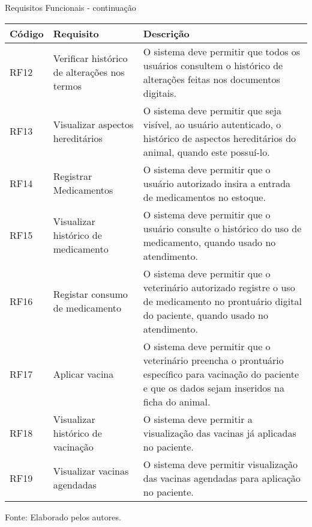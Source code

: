 \documentclass[
    12pt,               %
    openright,          %
    oneside,
    a4paper,            %
    BIBLATEX,           %
    TODO,               %
    english,            %
    brazil              %
    ]{ifsp-spo-inf-ctds}
\begin{document}
            \begin{center}
                \begin{quadro}[H]
                \caption{Requisitos Funcionais - continuação}
                \begin{tabulary}{1.0\textwidth}{|p{5em}|p{8em}|p{18em}|}
                \hline
                Código & Requisito & Descrição\\
                \hline
                RF12 & Verificar histórico de alterações nos termos & O sistema deve permitir que todos os usuários consultem o histórico de alterações feitas nos documentos digitais.\\
                \hline
                RF13 & Visualizar aspectos hereditários & O sistema deve permitir que seja visível, ao usuário autenticado, o histórico de aspectos hereditários do animal, quando este possuí-lo.\\
                \hline
                RF14 & Registrar Medicamentos & O sistema deve permitir que o usuário autorizado insira a entrada de medicamentos no estoque.\\
                \hline
                RF15 & Visualizar histórico de medicamento & O sistema deve permitir que o usuário consulte o histórico do uso de medicamento, quando usado no atendimento.\\
                \hline
                RF16 & Registar consumo de medicamento & O sistema deve permitir que o veterinário autorizado registre o uso de medicamento no prontuário digital do paciente, quando usado no atendimento.\\ 
                \hline
                RF17 & Aplicar vacina & O sistema deve permitir que o veterinário preencha o prontuário específico para vacinação do paciente e que os dados sejam inseridos na ficha do animal.\\
                \hline
                RF18 & Visualizar histórico de vacinação & O sistema deve permitir a visualização das vacinas já aplicadas no paciente.\\
                \hline
                RF19 & Visualizar vacinas agendadas & O sistema deve permitir visualização das vacinas agendadas para aplicação no paciente.\\
                \hline
                \end{tabulary}
                \label{tab:req_func2}
                \centering
                
                \footnotesize {Fonte: Elaborado pelos autores.}
                \end{quadro}
            \end{center}
        
\end{document}

